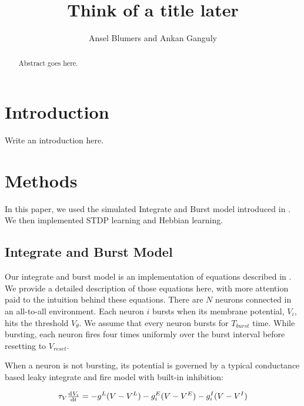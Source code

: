 \documentclass[12pt, final]{article}
\begin{document}
\newcommand{\Pois}{\text{Pois}}

\newtheorem{prop}{Proposition}


\title{Think of a title later}
\author{Ansel Blumers and Ankan Ganguly}
\maketitle

\begin{abstract}
Abstract goes here.
\end{abstract}

\newpage

\tableofcontents

\newpage

\section{Introduction}

Write an introduction here.

\section{Methods}

In this paper, we used the simulated Integrate and Burst model introduced in \cite{Fiete}. We then implemented STDP learning and Hebbian learning.

\subsection{Integrate and Burst Model}

Our integrate and burst model is an implementation of equations described in \cite{Fiete}. We provide a detailed description of those equations here, with more attention paid to the intuition behind these equations. There are \(N\) neurons connected in an all-to-all environment. Each neuron \(i\) bursts when its membrane potential, \(V_i\), hits the threshold \(V_\theta\). We assume that every neuron bursts for \(T_{burst}\) time. While bursting, each neuron fires four times uniformly over the burst interval before resetting to \(V_{reset}\).

When a neuron is not bursting, its potential is governed by a typical conductance based leaky integrate and fire model with built-in inhibition:

\begin{equation}
\tau_V \od{V_i}{t} = -g^L(V - V^L) - g^E_i(V - V^E) - g^I_i(V - V^I)
\label{Potential}
\end{equation}
\end{document}
